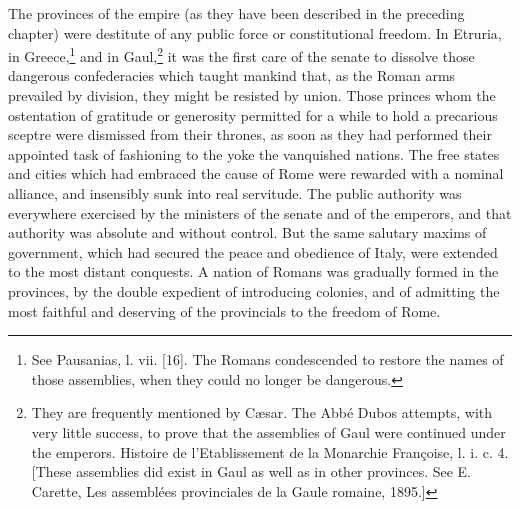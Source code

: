 The provinces of the empire (as they have been described in the preceding chapter) were destitute of any public force or constitutional freedom. In Etruria, in Greece,\footnote{See Pausanias, l. vii. [16]. The Romans condescended to restore the names of those assemblies, when they could no longer be dangerous.} and in Gaul,\footnote{They are frequently mentioned by Cæsar. The Abbé Dubos attempts, with very little success, to prove that the assemblies of Gaul were continued under the emperors. Histoire de l\texthebrew{}’Etablissement de la Monarchie Françoise, l. i. c. 4. [These assemblies did exist in Gaul as well as in other provinces. See E. Carette, Les assemblées provinciales de la Gaule romaine, 1895.]} it was the first care of the senate to dissolve those dangerous confederacies which taught mankind that, as the Roman arms prevailed by division, they might be resisted by union. Those princes whom the ostentation of gratitude or generosity permitted for a while to hold a precarious sceptre were dismissed from their thrones, as soon as they had performed their appointed task of fashioning to the yoke the vanquished nations. The free states and cities which had embraced the cause of Rome were rewarded with a nominal alliance, and insensibly sunk into real servitude. The public authority was everywhere exercised by the ministers of the senate and of the emperors, and that authority was absolute and without control. But the same salutary maxims of government, which had secured the peace and obedience of Italy, were extended to the most distant conquests. A nation of Romans was gradually formed in the provinces, by the double expedient of introducing colonies, and of admitting the most faithful and deserving of the provincials to the freedom of Rome.


